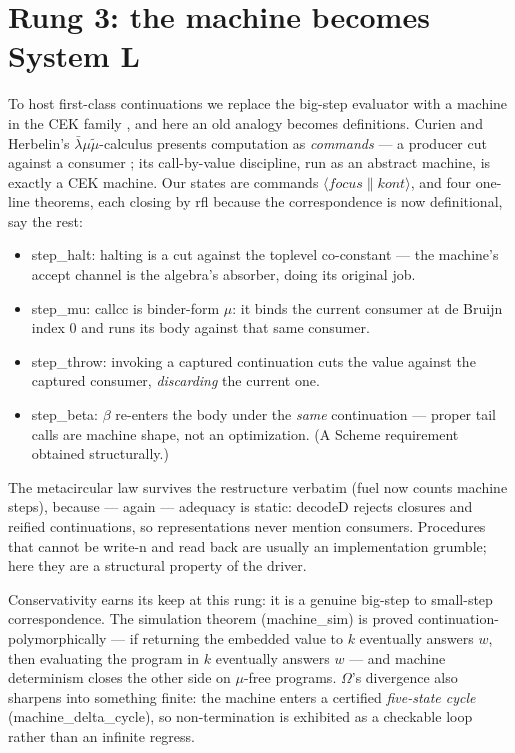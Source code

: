 \documentclass[acmsmall,screen,review]{acmart}
\begin{document}
\section{Rung 3: the machine becomes System L}
\label{sec:ctrl}

To host first-class continuations we replace the big-step evaluator
with a machine in the CEK family \cite{felleisen86}, and here an
old analogy becomes definitions. Curien and Herbelin's
$\bar\lambda\mu\tilde\mu$-calculus presents computation as
\emph{commands} --- a producer cut against a consumer
\cite{curien00}; its call-by-value discipline, run as an abstract
machine, is exactly a CEK machine. Our states are commands
$\langle \mathit{focus} \parallel \mathit{kont} \rangle$, and four
one-line theorems, each closing by \textsf{rfl} because the
correspondence is now definitional, say the rest:

\begin{itemize}
\item \textsf{step\_halt}: halting is a cut against the toplevel
  co-constant --- the machine's accept channel is the algebra's
  absorber, doing its original job.
\item \textsf{step\_mu}: \textsf{callcc} is binder-form $\mu$: it
  binds the current consumer at de Bruijn index 0 and runs its body
  against that same consumer.
\item \textsf{step\_throw}: invoking a captured continuation cuts the
  value against the captured consumer, \emph{discarding} the current
  one.
\item \textsf{step\_beta}: $\beta$ re-enters the body under the
  \emph{same} continuation --- proper tail calls are machine shape,
  not an optimization. (A Scheme requirement obtained structurally.)
\end{itemize}

The metacircular law survives the restructure verbatim (fuel now
counts machine steps), because --- again --- adequacy is static:
\textsf{decodeD} rejects closures and reified continuations, so
representations never mention consumers. Procedures that cannot be
\textsf{write}-n and \textsf{read} back are usually an
implementation grumble; here they are a structural property of the
driver.

Conservativity earns its keep at this rung: it is a genuine big-step
to small-step correspondence. The simulation theorem
(\textsf{machine\_sim}) is proved continuation-polymorphically ---
if returning the embedded value to $k$ eventually answers $w$, then
evaluating the program in $k$ eventually answers $w$ --- and
machine determinism closes the other side on $\mu$-free programs.
$\Omega$'s divergence also sharpens into something finite: the
machine enters a certified \emph{five-state cycle}
(\textsf{machine\_delta\_cycle}), so non-termination is exhibited as
a checkable loop rather than an infinite regress.
\end{document}
